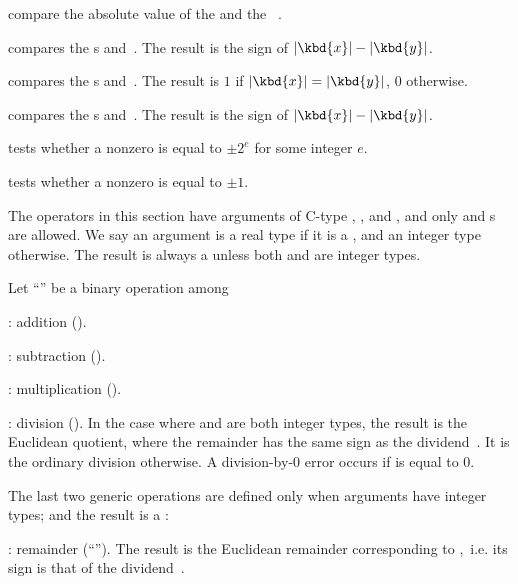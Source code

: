 
 compare the absolute value of the
  and the ~.



 compares the s  and~.
The result is the sign of $|\kbd{x}| - |\kbd{y}|$.

 compares the s 
and~. The result is $1$ if $|\kbd{x}| = |\kbd{y}|$, $0$ otherwise.

 compares the s  and~.
The result is the sign of $|\kbd{x}| - |\kbd{y}|$.

 tests whether a nonzero  
is equal to $\pm 2^e$ for some integer $e$.

 tests whether a nonzero  
is equal to $\pm 1$.

\label{se:genbinop} The operators in this
section have arguments of C-type , , and , and
only  and  s are allowed. We say an argument is a
real type if it is a  , and an integer type otherwise. The
result is always a  unless both  and  are integer
types.

Let ``\op'' be a binary operation among

\item {}: addition ().

\item {}: subtraction ().

\item {}: multiplication ().

\item {}: division (). In the case where  and 
are both integer types, the result is the Euclidean quotient, where the
remainder has the same sign as the dividend~. It is the ordinary
division otherwise. A division-by-$0$ error occurs if  is equal to
$0$.

The last two generic operations are defined only when arguments have integer
types; and the result is a :

\item {}: remainder (``''). The result is the Euclidean
remainder corresponding to ,~i.e. its sign is that of the
dividend~.

